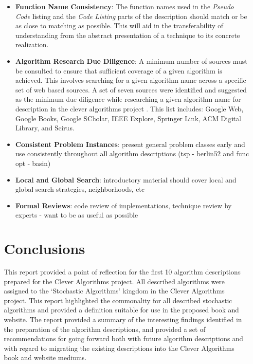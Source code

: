 \documentclass[a4paper, 11pt]{article}
\begin{document}
\begin{itemize}
	\item \textbf{Function Name Consistency}: The function names used in the \emph{Pseudo Code} listing and the \emph{Code Listing} parts of the description should match or be as close to matching as possible. This will aid in the transferability of understanding from the abstract presentation of a technique to its concrete realization.
	\item \textbf{Algorithm Research Due Diligence}: A minimum number of sources must be consulted to ensure that sufficient coverage of a given algorithm is achieved. This involves searching for a given algorithm name across a specific set of web based sources. A set of seven sources were identified and suggested as the minimum due diligence while researching a given algorithm name for description in the clever algorithms project \cite{Brownlee2010h}. This list includes: Google Web, Google Books, Google SCholar, IEEE Explore, Springer Link, ACM Digital Library, and Scirus.
	
	
	\item \textbf{Consistent Problem Instances}: present general problem classes early and use consistently throughout all algorithm descriptions (tsp - berlin52 and func opt - basin)
	\item \textbf{Local and Global Search}: introductory material should cover local and global search strategies, neighborhoods, etc
	\item \textbf{Formal Reviews}: code review of implementations, technique review by experts - want to be as useful as possible
\end{itemize}

% 
% 
\section{Conclusions}
\label{sec:conclusions}
This report provided a point of reflection for the first 10 algorithm descriptions prepared for the Clever Algorithms project. All described algorithms were assigned to the `Stochastic Algorithms' kingdom in the Clever Algorithms project. This report highlighted the commonality for all described stochastic algorithms and provided a definition suitable for use in the proposed book and website.
The report provided a summary of the interesting findings identified in the preparation of the algorithm descriptions, and provided a set of recommendations for going forward both with future algorithm descriptions and with regard to migrating the existing descriptions into the Clever Algorithms book and website mediums.



\end{document}
